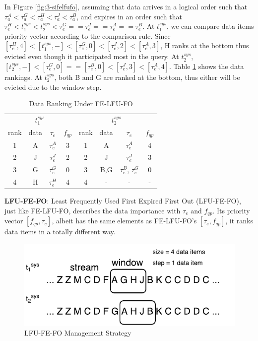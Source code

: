 In Figure \ref{fig:3-sifelfufo}, assuming that data arrives in a logical order such that $\tau^{A}_{a} < \tau^{G}_{a} < \tau^{H}_{a} < \tau^{J}_{a} < \tau^{B}_{a}$, and expires in an order such that $\tau^{H}_{e} < t^{sys}_{1} < t^{sys}_{2} < \tau^{G}_{e} == \tau^{J}_{e} == \tau^{A}_{e} == \tau^{B}_{e}$.
At $t^{sys}_{1}$, we can compare data items priority vector according to the comparison rule. 
Since $[\tau^{H}_{e}, 4] < [t^{sys}_{1}, -] < [\tau^{G}_{e}, 0] < [\tau^{J}_{e}, 2] < [\tau^{A}_{e}, 3]$, H ranks at the bottom thus evicted even though it participated most in the query. 
At $t^{sys}_{2}$, $[t^{sys}_{2}, -] < [\tau^{G}_{e}, 0] == [\tau^{B}_{e}, 0] < [\tau^{J}_{e}, 3] < [\tau^{A}_{e}, 4]$.
Table \ref{tab:felfufo} shows the data rankings. 
At $t^{sys}_{2}$, both B and G are ranked at the bottom, thus either will be evicted due to the window step. 

\begin{table}[!htbp]
\centering
\caption{Data Ranking Under FE-LFU-FO}
\label{tab:felfufo}
\begin{tabular}{|c|c|c|c||c|c|c|c|}
\hline
\multicolumn{4}{|c||}{$t^{sys}_{1}$} & \multicolumn{4}{c|}{$t^{sys}_{2}$} \\ \hhline{|========|}
rank & data & $\tau_{e}$ & $f_{qp}$ & rank & data & $\tau_{e}$ & $f_{qp}$ \\ \hhline{|=|=|=|=#=|=|=|=|}
1 & A & $\tau^{A}_{e}$ & 3 & 1 & A & $\tau^{A}_{e}$ & 4 \\ \hline
2 & J & $\tau^{J}_{e}$ & 2 & 2 & J & $\tau^{J}_{e}$ & 3 \\ \hline
3 & G & $\tau^{G}_{e}$ & 0 & 3 & B,G & $\tau^{B}_{e}$, $\tau^{G}_{e}$ & 0 \\ \hline
4 & H & $\tau^{H}_{e}$ & 4 & 4 & - & - & - \\ \hline
\end{tabular}
\end{table}

\textbf{LFU-FE-FO}:
Least Frequently Used First Expired First Out (LFU-FE-FO), just like FE-LFU-FO, describes the data importance with $\tau_{e}$ and $f_{qp}$. 
Its priority vector $[f_{qp}, \tau_{e}]$, albeit has the same elements as FE-LFU-FO's $[\tau_{e}, f_{qp}]$, it ranks data items in a totally different way. 

\begin{figure}[!htbp]
	\centering
    \includegraphics[width=5in]{img/3-silfufefo.pdf}
    \caption{LFU-FE-FO Management Strategy}
    \label{fig:3-silfufefo}
\end{figure}

